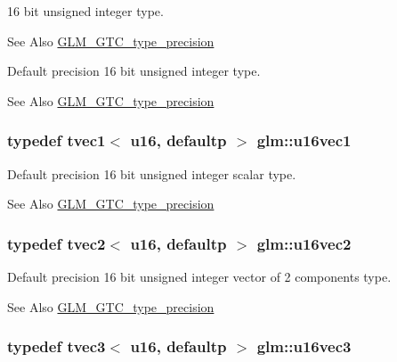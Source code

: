 16 bit unsigned integer type. \begin{DoxySeeAlso}{See Also}
\hyperlink{group__gtc__type__precision}{G\-L\-M\-\_\-\-G\-T\-C\-\_\-type\-\_\-precision}
\end{DoxySeeAlso}
Default precision 16 bit unsigned integer type. \begin{DoxySeeAlso}{See Also}
\hyperlink{group__gtc__type__precision}{G\-L\-M\-\_\-\-G\-T\-C\-\_\-type\-\_\-precision} 
\end{DoxySeeAlso}
\hypertarget{group__gtc__type__precision_ga809cb55e5fed3456686aae96e7e8684c}{
\subsubsection[{u16vec1}]{\setlength{\rightskip}{0pt plus 5cm}typedef tvec1$<$ u16, defaultp $>$ {\bf glm\-::u16vec1}}}\label{group__gtc__type__precision_ga809cb55e5fed3456686aae96e7e8684c}
Default precision 16 bit unsigned integer scalar type. \begin{DoxySeeAlso}{See Also}
\hyperlink{group__gtc__type__precision}{G\-L\-M\-\_\-\-G\-T\-C\-\_\-type\-\_\-precision} 
\end{DoxySeeAlso}
\hypertarget{group__gtc__type__precision_ga10e8900b9610f930772aa55aee8e3121}{
\subsubsection[{u16vec2}]{\setlength{\rightskip}{0pt plus 5cm}typedef tvec2$<$ u16, defaultp $>$ {\bf glm\-::u16vec2}}}\label{group__gtc__type__precision_ga10e8900b9610f930772aa55aee8e3121}
Default precision 16 bit unsigned integer vector of 2 components type. \begin{DoxySeeAlso}{See Also}
\hyperlink{group__gtc__type__precision}{G\-L\-M\-\_\-\-G\-T\-C\-\_\-type\-\_\-precision} 
\end{DoxySeeAlso}
\hypertarget{group__gtc__type__precision_ga947d0d003e016eaf2038d6843b427257}{
\subsubsection[{u16vec3}]{\setlength{\rightskip}{0pt plus 5cm}typedef tvec3$<$ u16, defaultp $>$ {\bf glm\-::u16vec3}}}\label{group__gtc__type__precision_ga947d0d003e016eaf2038d6843b427257}
